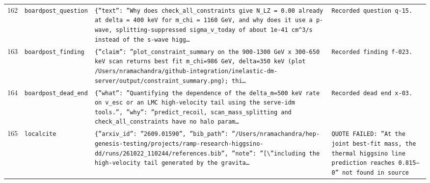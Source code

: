 \documentclass[11pt,a4paper]{article}
\begin{document}
\begin{longtable}{@{}p{}p{}p{}p{}@{}}
162 & \texttt{board}\newline\texttt{post\_\allowbreak{}question} & \texttt{\{''text'':\allowbreak{} ''Why does check\_\allowbreak{}all\_\allowbreak{}constraints give N\_\allowbreak{}LZ =\allowbreak{} 0.00 already at delta =\allowbreak{} 400 keV for m\_\allowbreak{}chi =\allowbreak{} 1160 GeV,\allowbreak{} and why does it use a p-wave,\allowbreak{} splitting-suppressed sigma\_\allowbreak{}v\_\allowbreak{}today of about 1e-41 cm\textasciicircum{}\allowbreak{}3/\allowbreak{}s instead of the s-wave higg\ldots{}\allowbreak{}} & \texttt{Recorded question q-15.} \\
163 & \texttt{board}\newline\texttt{post\_\allowbreak{}finding} & \texttt{\{''claim'':\allowbreak{} ''plot\_\allowbreak{}constraint\_\allowbreak{}summary on the 900-1300 GeV x 300-650 keV scan returns best fit m\_\allowbreak{}chi=\allowbreak{}986 GeV,\allowbreak{} delta=\allowbreak{}350 keV (plot /\allowbreak{}Users/\allowbreak{}nramachandra/\allowbreak{}github-integration/\allowbreak{}inelastic-dm-server/\allowbreak{}output/\allowbreak{}constraint\_\allowbreak{}summary.png)\allowbreak{};\allowbreak{} thi\ldots{}\allowbreak{}} & \texttt{Recorded finding f-023.} \\
164 & \texttt{board}\newline\texttt{post\_\allowbreak{}dead\_\allowbreak{}end} & \texttt{\{''what'':\allowbreak{} ''Quantifying the dependence of the delta\_\allowbreak{}m=\allowbreak{}500 keV rate on v\_\allowbreak{}esc or an LMC high-velocity tail using the serve-idm tools.'',\allowbreak{} ''why'':\allowbreak{} ''predict\_\allowbreak{}recoil,\allowbreak{} scan\_\allowbreak{}mass\_\allowbreak{}splitting and check\_\allowbreak{}all\_\allowbreak{}constraints have no halo param\ldots{}\allowbreak{}} & \texttt{Recorded dead end x-03.} \\
165 & \texttt{local}\newline\texttt{cite} & \texttt{\{''arxiv\_\allowbreak{}id'':\allowbreak{} ''2609.01590'',\allowbreak{} ''bib\_\allowbreak{}path'':\allowbreak{} ''/\allowbreak{}Users/\allowbreak{}nramachandra/\allowbreak{}hep-genesis-testing/\allowbreak{}projects/\allowbreak{}ramp-research-higgsino-dd/\allowbreak{}runs/\allowbreak{}261022\_\allowbreak{}110244/\allowbreak{}references.bib'',\allowbreak{} ''note'':\allowbreak{} ''[\textbackslash{}\allowbreak{}''including the high-velocity tail generated by the gravita\ldots{}\allowbreak{}} & \texttt{QUOTE FAILED:\allowbreak{} ''At the joint best-fit mass,\allowbreak{} the thermal higgsino line prediction reaches 0.815--0'' not found in source} \\

\end{longtable}
\end{document}
